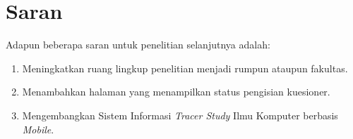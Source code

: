 \section{Saran}
Adapun beberapa saran untuk penelitian selanjutnya adalah:
\begin{enumerate}
	
	\item Meningkatkan ruang lingkup penelitian menjadi rumpun ataupun fakultas. 
	
	\item Menambahkan halaman yang menampilkan status pengisian kuesioner. 
	
	\item Mengembangkan Sistem Informasi \textit{Tracer Study} Ilmu Komputer berbasis \textit{Mobile}. 
		
\end{enumerate}


\begin{comment}

\end{comment}